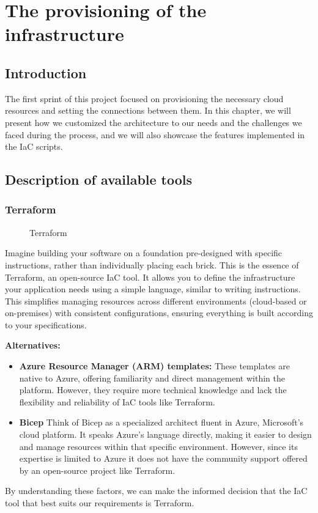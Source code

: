 \chapter{The provisioning of the infrastructure}

\section*{Introduction}
\noindent
The first sprint of this project focused on provisioning the necessary cloud resources and setting the connections between them. In this chapter, we will present how we customized the architecture to our needs and the challenges we faced during the process, and we will also showcase the features implemented in the IaC scripts.

\section{Description of available tools}

\subsection{Terraform}

\begin{figure}[htpb]
    \centering
    \caption{Terraform}
    \label{fig:terraform}
\end{figure}

Imagine building your software on a foundation pre-designed with specific instructions, rather than individually placing each brick. This is the essence of Terraform, an open-source IaC tool. It allows you to define the infrastructure your application needs using a simple language, similar to writing instructions. This simplifies managing resources across different environments (cloud-based or on-premises) with consistent configurations, ensuring everything is built according to your specifications.
\par
\textbf{Alternatives:}
\begin{itemize}
    \item \textbf{Azure Resource Manager (ARM) templates:} These templates are native to Azure, offering familiarity and direct management within the platform. However, they require more technical knowledge and lack the flexibility and reliability of IaC tools like Terraform.
    \item \textbf{Bicep} Think of Bicep as a specialized architect fluent in Azure, Microsoft's cloud platform. It speaks Azure's language directly, making it easier to design and manage resources within that specific environment. However, since its expertise is limited to Azure it does not have the community support offered by an open-source project like Terraform.
\end{itemize}
By understanding these factors, we can make the informed decision that the IaC tool that best suits our requirements is Terraform.
